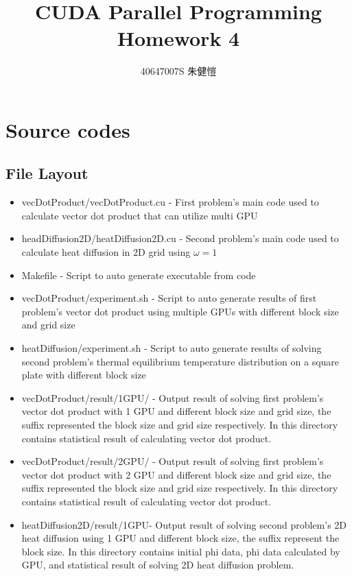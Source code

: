 \documentclass{article}
\title{CUDA Parallel Programming\\Homework 4}
\author{40647007S 朱健愷}
\begin{document}
	\maketitle
	\section{Source codes}
	\subsection{File Layout}
	\begin{itemize}
		\item vecDotProduct/vecDotProduct.cu - First problem's main code used to calculate vector dot product that can utilize multi GPU
		\item headDiffusion2D/heatDiffusion2D.cu - Second problem's main code used to calculate heat diffusion in 2D grid using $\omega=1$
		\item Makefile - Script to auto generate executable from code
		\item vecDotProduct/experiment.sh - Script to auto generate results of first problem's vector dot product using multiple GPUs with different block size and grid size
		\item heatDiffusion/experiment.sh - Script to auto generate results of solving second problem's thermal 
		equilibrium temperature distribution on a square plate with different block size
		\item vecDotProduct/result/1GPU\textunderscore*{}\textunderscore*/ - Output result of solving first problem's vector dot product with 1 GPU and different block size and grid size, the suffix represented the block size and grid size respectively. In this directory contains statistical result of calculating vector dot product.
		\item vecDotProduct/result/2GPU\textunderscore*{}\textunderscore*/ - Output result of solving first problem's vector dot product with 2 GPU and different block size and grid size, the suffix represented the block size and grid size respectively. In this directory contains statistical result of calculating vector dot product.
		\item heatDiffusion2D/result/1GPU\textunderscore* - Output result of solving second problem's 2D heat diffusion using 1 GPU and different block size, the suffix represent the block size. In this directory contains initial phi data, phi data calculated by GPU, and statistical result of solving 2D heat diffusion problem.

\end{itemize}
\end{document}
